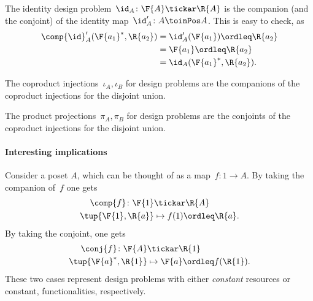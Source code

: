 \begin{example}The identity design problem~$\id_A\colon \F{A} \tickar \R{A}$ is the companion (and the conjoint) of the identity map~$\id_A'\colon A \toinPos A$. This is easy to check, as
\begin{equation}
    \begin{aligned}
    \comp{\id}_A'(\F{a_1}^*,\R{a_2})&=\id_A'(\F{a_1})\ordleq \R{a_2}\\
    &=\F{a_1}\ordleq \R{a_2}\\
    &=\id_A(\F{a_1}^*,\R{a_2}).
    \end{aligned}
\end{equation}
\end{example}

\begin{example}The coproduct injections~$\iota_A, \iota_B$ for design problems are the companions of the coproduct injections for the disjoint union.
\end{example}

\begin{example}The product projections~$\pi_A, \pi_B$ for design problems are the conjoints of the coproduct injections for the disjoint union.
\end{example}


\paragraph{Interesting implications}
Consider a poset $A$, which can be thought of as a map~$f\colon 1\to A$. By taking the companion of~$f$ one gets
\begin{equation}
\begin{aligned}
    \comp{f}\colon \F{1}&\tickar \R{A}\\
    \tup{\F{1},\R{a}}&\mapsto f(1)\ordleq \R{a}.
\end{aligned}
\end{equation}
By taking the conjoint, one gets
\begin{equation}
\begin{aligned}
    \conj{f}\colon \F{A}&\tickar \R{1}\\
    \tup{\F{a}^*,\R{1}}&\mapsto \F{a}\ordleq f(\R{1}).
\end{aligned}
\end{equation}
These two cases represent design problems with either \emph{constant} resources or constant, functionalities, respectively.

